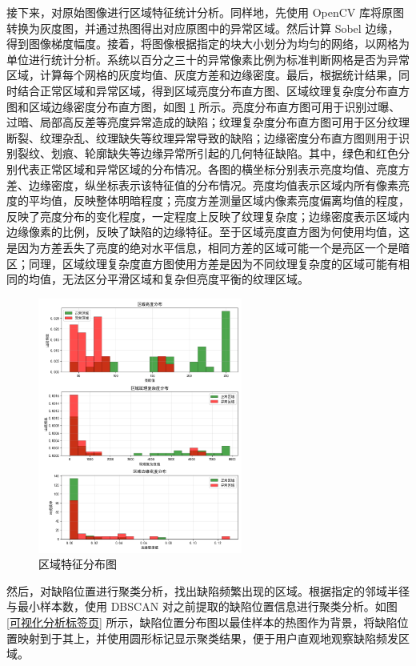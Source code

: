 \documentclass[
  ]{njuthesis}
\begin{document}
接下来，对原始图像进行区域特征统计分析。同样地，先使用 OpenCV 库将原图转换为灰度图，并通过热图得出对应原图中的异常区域。然后计算 Sobel 边缘，得到图像梯度幅度。接着，将图像根据指定的块大小划分为均匀的网络，以网格为单位进行统计分析。系统以百分之三十的异常像素比例为标准判断网格是否为异常区域，计算每个网格的灰度均值、灰度方差和边缘密度。最后，根据统计结果，同时结合正常区域和异常区域，得到区域亮度分布直方图、区域纹理复杂度分布直方图和区域边缘密度分布直方图，如图 \ref{区域特征分布图} 所示。亮度分布直方图可用于识别过曝、过暗、局部高反差等亮度异常造成的缺陷；纹理复杂度分布直方图可用于区分纹理断裂、纹理杂乱、纹理缺失等纹理异常导致的缺陷；边缘密度分布直方图则用于识别裂纹、划痕、轮廓缺失等边缘异常所引起的几何特征缺陷。其中，绿色和红色分别代表正常区域和异常区域的分布情况。各图的横坐标分别表示亮度均值、亮度方差、边缘密度，纵坐标表示该特征值的分布情况。亮度均值表示区域内所有像素亮度的平均值，反映整体明暗程度；亮度方差测量区域内像素亮度偏离均值的程度，反映了亮度分布的变化程度，一定程度上反映了纹理复杂度；边缘密度表示区域内边缘像素的比例，反映了缺陷的边缘特征。至于区域亮度直方图为何使用均值，这是因为方差丢失了亮度的绝对水平信息，相同方差的区域可能一个是亮区一个是暗区；同理，区域纹理复杂度直方图使用方差是因为不同纹理复杂度的区域可能有相同的均值，无法区分平滑区域和复杂但亮度平衡的纹理区域。

\begin{figure}[htb]
    \centering
    \includegraphics[width=0.6\textwidth]{images/区域特征分布图.png}
    \caption{区域特征分布图}
    \label{区域特征分布图}
\end{figure}

然后，对缺陷位置进行聚类分析，找出缺陷频繁出现的区域。根据指定的邻域半径与最小样本数，使用 DBSCAN 对之前提取的缺陷位置信息进行聚类分析。如图 \ref{可视化分析标签页} 所示，缺陷位置分布图以最佳样本的热图作为背景，将缺陷位置映射到于其上，并使用圆形标记显示聚类结果，便于用户直观地观察缺陷频发区域。
\end{document}
